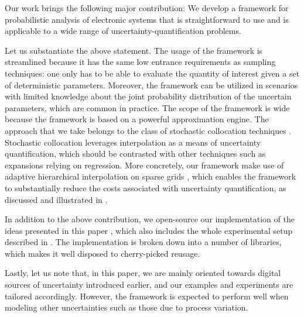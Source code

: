 Our work brings the following major contribution: We develop a framework for
probabilistic analysis of electronic systems that is straightforward to use and
is applicable to a wide range of uncertainty-quantification problems.

Let us substantiate the above statement. The usage of the framework is
streamlined because it has the same low entrance requirements as sampling
techniques: one only has to be able to evaluate the quantity of interest given a
set of deterministic parameters. Moreover, the framework can be utilized in
scenarios with limited knowledge about the joint probability distribution of the
uncertain parameters, which are common in practice. The scope of the framework
is wide because the framework is based on a powerful approximation engine. The
approach that we take belongs to the class of stochastic collocation techniques
\cite{xiu2010}. Stochastic collocation leverages interpolation as a means of
uncertainty quantification, which should be contrasted with other techniques
such as  expansions relying on regression. More concretely, our framework
make use of adaptive hierarchical interpolation on sparse grids
\cite{jakeman2012, klimke2006, ma2009}, which enables the framework to
substantially reduce the costs associated with uncertainty quantification, as
discussed and illustrated in .

In addition to the above contribution, we open-source our implementation of the
ideas presented in this paper \cite{sources}, which also includes the whole
experimental setup described in . The implementation is
broken down into a number of libraries, which makes it well disposed to
cherry-picked reusage.

Lastly, let us note that, in this paper, we are mainly oriented towards digital
sources of uncertainty introduced earlier, and our examples and experiments are
tailored accordingly. However, the framework is expected to perform well when
modeling other uncertainties such as those due to process variation.
